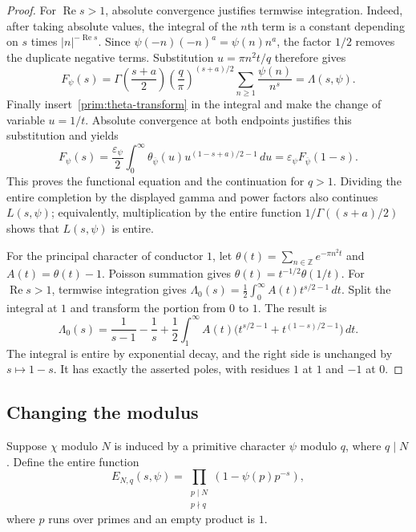 \begin{proof}
For $\operatorname{Re}s>1$, absolute convergence justifies termwise
integration.  Indeed, after taking absolute values, the integral of the
$n$th term is a constant depending on $s$ times $|n|^{-\operatorname{Re}s}$.
Since $\psi(-n)(-n)^a=\psi(n)n^a$, the factor $1/2$ removes the duplicate
negative terms.  Substitution $u=\pi n^2t/q$ therefore gives
\[
 F_\psi(s)
 =\Gamma\left(\frac{s+a}{2}\right)
      \left(\frac q\pi\right)^{(s+a)/2}
      \sum_{n\geq1}\frac{\psi(n)}{n^s}
 =\Lambda(s,\psi).
\]
Finally insert~\eqref{prim:theta-transform} in the integral and make the
change of variable $u=1/t$.  Absolute convergence at both endpoints
justifies this substitution and yields
\[
 F_\psi(s)=\frac{\varepsilon_\psi}{2}
       \int_0^\infty\theta_{\overline\psi}(u)
           u^{(1-s+a)/2-1}\,du
   =\varepsilon_\psi F_{\overline\psi}(1-s).
\]
This proves the functional equation and the continuation for $q>1$.
Dividing the entire completion by the displayed gamma and power factors
also continues $L(s,\psi)$; equivalently, multiplication by the entire
function $1/\Gamma((s+a)/2)$ shows that $L(s,\psi)$ is entire.

For the principal character of conductor $1$, let
$\theta(t)=\sum_{n\in\mathbb Z}e^{-\pi n^2t}$ and $A(t)=\theta(t)-1$.
Poisson summation gives $\theta(t)=t^{-1/2}\theta(1/t)$.
For $\operatorname{Re}s>1$, termwise integration gives
$\Lambda_0(s)=\frac12\int_0^\infty A(t)t^{s/2-1}\,dt$.
Split the integral at $1$ and transform the portion from $0$ to $1$.
The result is
\begin{equation}\label{prim:zeta-continuation}
 \Lambda_0(s)=\frac1{s-1}-\frac1s
  +\frac12\int_1^\infty A(t)
       \bigl(t^{s/2-1}+t^{(1-s)/2-1}\bigr)\,dt.
\end{equation}
The integral is entire by exponential decay, and the right side is
unchanged by $s\mapsto1-s$.  It has exactly the asserted poles, with
residues $1$ at $1$ and $-1$ at $0$.
\end{proof}

\subsection{Changing the modulus}

Suppose $\chi$ modulo $N$ is induced by a primitive character $\psi$
modulo $q$, where $q\mid N$.  Define the entire function
\[
 E_{N,q}(s,\psi)
   =\prod_{\substack{p\mid N\\p\nmid q}}
         (1-\psi(p)p^{-s}),
\]
where $p$ runs over primes and an empty product is $1$.

